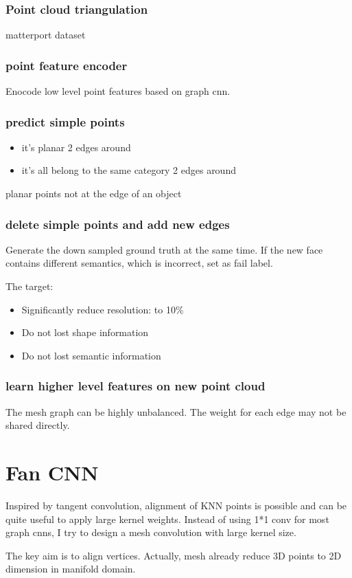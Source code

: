 \documentclass[,table,dvipsnames]{article}
\begin{document}
\subsubsection{Point cloud triangulation}
matterport dataset
\subsubsection{point feature encoder}
Enocode low level point features based on graph cnn.
\subsubsection{predict simple points}
\begin{itemize}
	\item it's planar 2 edges around
	\item it's all belong to the same category 2 edges around
\end{itemize}
planar points not at the edge of an object
\subsubsection{delete simple points and add new edges}

Generate the down sampled ground truth at the same time. If the new face contains different semantics, which is incorrect, set as fail label.
\par \noindent
The target:
\begin{itemize}
	\item Significantly reduce resolution: to 10\%
	\item Do not lost shape information
	\item Do not lost semantic information
	

	
\end{itemize}
\subsubsection{learn higher level features on new point cloud}
The mesh graph can be highly unbalanced. The weight for each edge may not be shared directly. 


\section{Fan CNN}
Inspired by tangent convolution, alignment of KNN points is possible and can be quite useful to apply large kernel weights. Instead of using 1*1 conv for most graph cnns, I try to design a mesh convolution with large kernel size.
\par
The key aim is to align vertices. Actually, mesh already reduce 3D points to 2D dimension in manifold domain.
\end{document}
